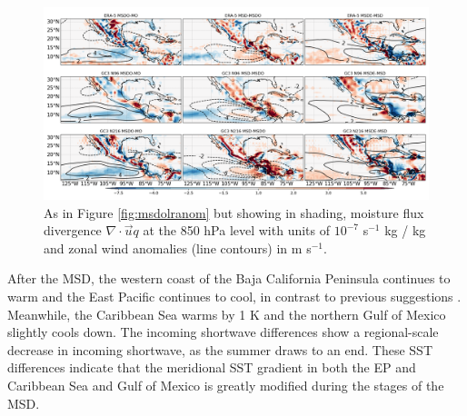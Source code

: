  \begin{figure}[t!]
\includegraphics[width=\linewidth]{figures/modcompar_dif2mfc3}
\caption{As in Figure \ref{fig:msdolranom} but showing in shading, moisture flux divergence $\nabla \cdot \vec{u}q$ at the 850 hPa level with units of $10^{-7}$ s$^{-1}$ kg / kg and zonal wind anomalies (line contours) in m s$^{-1}$.  }
\label{fig:msdmfcanom}
\end{figure}

After the MSD, the western coast of the Baja California Peninsula continues to warm and the East Pacific continues to cool, in contrast to previous suggestions \citep{magana1999,magana2005,herrera2015}. Meanwhile, the Caribbean Sea warms by 1 K and the northern Gulf of Mexico slightly cools down. The incoming shortwave differences show a regional-scale decrease in incoming shortwave, as the summer draws to an end. 
These SST differences indicate that the meridional SST gradient in both the EP and Caribbean Sea and Gulf of Mexico is greatly modified during the stages of the MSD. 






